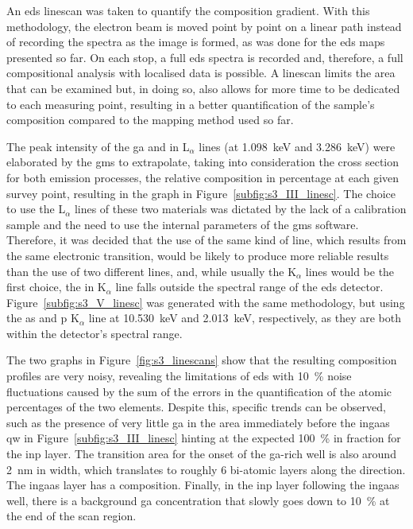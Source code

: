 An \acs{eds} linescan was taken to quantify the composition gradient. With this methodology, the electron beam is moved point by point on a linear path instead of recording the spectra as the image is formed, as was done for the \acs{eds} maps presented so far. On each stop, a full \acs{eds} spectra is recorded and, therefore, a full compositional analysis with localised data is possible. A linescan limits the area that can be examined but, in doing so, also allows for more time to be dedicated to each measuring point, resulting in a better quantification of the sample's composition compared to the mapping method used so far.

The peak intensity of the \acl{ga} and \acl{in} L\(_\alpha\) lines (at \qty{1.098}{\kilo\eV} and \qty{3.286}{\kilo\eV}) were elaborated by the \acf{gms} to extrapolate, taking into consideration the cross section for both emission processes, the relative composition in percentage at each given survey point, resulting in the graph in Figure~\ref{subfig:s3_III_linesc}. The choice to use the L\(_\alpha\) lines of these two materials was dictated by the lack of a calibration sample and the need to use the internal parameters of the \acs{gms} software. Therefore, it was decided that the use of the same kind of line, which results from the same electronic transition, would be likely to produce more reliable results than the use of two different lines, and, while usually the K\(_\alpha\) lines would be the first choice, the \acs{in} K\(_\alpha\) line falls outside the spectral range of the \acs{eds} detector. Figure~\ref{subfig:s3_V_linesc} was generated with the same methodology, but using the \acl{as} and \acl{p} K\(_\alpha\) line at \qty{10.530}{\kilo\eV} and \qty{2.013}{\kilo\eV}, respectively, as they are both within the detector's spectral range.

The two graphs in Figure~\ref{fig:s3_linescans} show that the resulting composition profiles are very noisy, revealing the limitations of \acs{eds} with \qty{10}{\%} noise fluctuations caused by the sum of the errors in the quantification of the atomic percentages of the two elements. Despite this, specific trends can be observed, such as the presence of very little \acl{ga} in the area immediately before the \acs{ingaas} \acl{qw} in Figure~\ref{subfig:s3_III_linesc} hinting at the expected \qty{100}{\%} \acl{in} fraction for the \acs{inp} layer. The transition area for the onset of the \acs{ga}-rich well is also around \qty{2}{nm} in width, which translates to roughly \num{6} bi-atomic layers along the  direction. The \acs{ingaas} layer has a  composition. Finally, in the \acs{inp} layer following the \acs{ingaas} well, there is a background \acl{ga} concentration that slowly goes down to \qty{10}{\%} at the end of the scan region.

